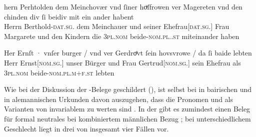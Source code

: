 \begin{exe}
\ex \label{ex:m+f_si_beide_iu}
	\begin{xlist}
	\ex \label{ex:m+f_si_beidiu}
		\gll hern Perhtolden dem Meinchovær vnd ſiner hoͮſfrowen ver Magereten
				vnd den chinden div ſi beidiv {mit ein ander} habent \\
			Herrn Berthold-\textsc{dat.sg.\MascM} dem Meinchauer und seiner
				Ehefrau[\textsc{dat.sg.\FemF}] Frau Margarete und den Kindern
				die \textsc{3pl\subMF.nom} beide-\textsc{nom.pl.\NeutMF.st}
				miteinander haben \\
		\trans {}
			\parencites(Nr.~937, Regensburg, 1287)[292,40--41]{cao2}

	\ex \label{ex:m+f_si_beide}
		\gll Her Ernſt · vnſer burger / vnd ver Gerdroͤvt ſein hovsvrowe / da
				ſi baide lebten \\
			Herr Ernst[\textsc{nom.sg.\MascM}] {} unser Bürger {} und Frau
				Gertrud[\textsc{nom.sg.\FemF}] sein Ehefrau {} als
				\textsc{3pl\subMF.nom} beide-\textsc{nom.pl.m+f\subMF.st}
				lebten \\
		\trans {}
			\parencites(Nr.~1073, Wien, 1289)[374,40--41]{cao2}
	\end{xlist}
\end{exe}

Wie bei der Diskussion der \CAO{}-Belege geschildert
(), ist selbst bei
 in bairischen und 
in alemannischen Urkunden davon auszugehen, dass die Pronomen
 und  als Varianten von invariablem  zu werten
sind \autocite[394--396]{ksw2}. In der \KC{} gibt es zumindest einen Beleg für
formal neutrales  bei kombiniertem männlichen Bezug
; bei unterschiedlichem Geschlecht liegt
 in drei von insgesamt vier Fällen vor.

